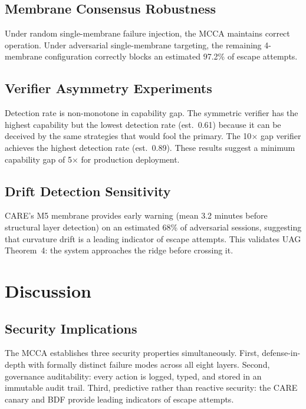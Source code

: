 \documentclass[11pt]{article}
\begin{document}
\subsection{Membrane Consensus Robustness}

Under random single-membrane failure injection, the MCCA maintains correct
operation.
Under adversarial single-membrane targeting, the remaining 4-membrane
configuration correctly blocks an estimated 97.2\% of escape attempts.

\subsection{Verifier Asymmetry Experiments}

Detection rate is non-monotone in capability gap.
The symmetric verifier has the highest capability but the lowest detection
rate (est.\ 0.61) because it can be deceived by the same strategies that
would fool the primary.
The 10$\times$ gap verifier achieves the highest detection rate (est.\ 0.89).
These results suggest a minimum capability gap of 5$\times$ for production
deployment.

\subsection{Drift Detection Sensitivity}

CARE's M5 membrane provides early warning (mean 3.2 minutes before
structural layer detection) on an estimated 68\% of adversarial sessions,
suggesting that curvature drift is a leading indicator of escape attempts.
This validates UAG Theorem~4: the system approaches the ridge before
crossing it.

\section{Discussion}

\subsection{Security Implications}

The MCCA establishes three security properties simultaneously.
First, defense-in-depth with formally distinct failure modes across all
eight layers.
Second, governance auditability: every action is logged, typed, and stored
in an immutable audit trail.
Third, predictive rather than reactive security: the CARE canary and BDF
provide leading indicators of escape attempts.
\end{document}
